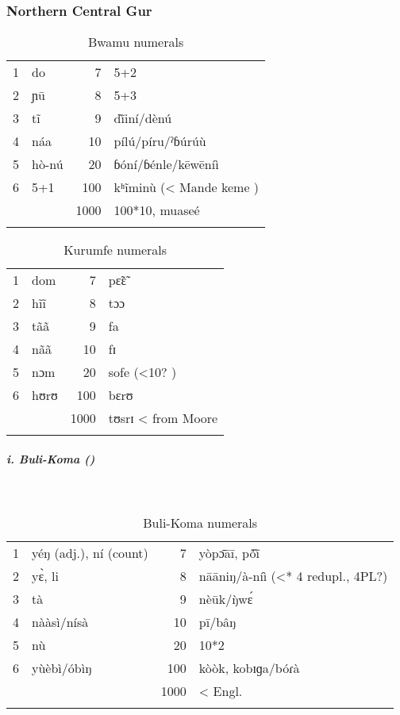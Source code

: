 \subsubsection{Northern Central Gur}%
\begin{table}
\caption{\label{tab:3:164}Bwamu numerals}


\begin{tabularx}{\textwidth}{lXrl}
\lsptoprule

{1} & do & {7} & 5+2\\
{2} & ɲū & {8} & 5+3\\
{3} & t{\~{i}} & {9} & d{\`ĩ}iní/dènú\\
{4} & náa & {10} & pílú/píru/ˀɓúrúù\\
{5} & hò-nú & {20} & ɓóní/ɓénle/kēwēníì\\
{6} & 5+1 & {100} & kʰ{\~{i}}minù (< Mande keme )\\
&  & {1000} & 100*10, muaseé\\
\lspbottomrule
\end{tabularx}
\end{table}

 
\begin{table}
\caption{\label{tab:3:165}Kurumfe numerals}


\begin{tabularx}{\textwidth}{lXrl}
\lsptoprule

{1} & dom & {7} & p{\~{ɛ}}{\~{ɛ}}\\
{2} & h{\~{i}}{\~{i}} & {8} & tɔɔ\\
{3} & t{\~{a}}{\~{a}} & {9} & fa\\
{4} & n{\~{a}}{\~{a}} & {10} & fɪ\\
{5} & nɔm & {20} & sofe (<10? )\\
{6} & hʊrʊ & {100} & bɛrʊ\\
&  & {1000} & tʊsrɪ < from Moore\\
\lspbottomrule
\end{tabularx}
\end{table}

 
\subparagraph{i. Buli-Koma ()}
~
\begin{table}
\caption{\label{tab:3:166}Buli-Koma numerals}


\begin{tabularx}{\textwidth}{lXrl}
\lsptoprule

{1} & yéŋ (adj.), ní (count) & {7} & yòp{\={ɔ}}āī, p{\'{\~o}}{\`ĩ}\\
{2} & y{\`{ɛ}}, li & {8} & nāāniŋ/à-níì (<* 4 redupl., 4PL?)\\
{3} & tà & {9} & nèūk/{\`{ŋ}}w{\'{ɛ}}\\
{4} & nààsì/nísà & {10} & pī/bâŋ\\
{5} & nù & {20} & 10*2\\
{6} & yùèbì/óbìŋ & {100} & kòòk, kobɪɡa/bóɾà\\
&  & {1000} & < Engl.\\
\lspbottomrule
\end{tabularx}
\end{table}

